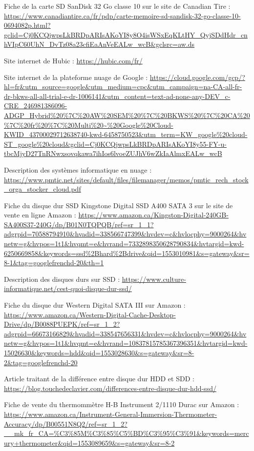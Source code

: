 \begin{thebibliographyUL}{9}
 Fiche de la carte SD SanDisk 32 Go classe 10 sur le site de Canadian Tire :
\url{https://www.canadiantire.ca/fr/pdp/carte-memoire-sd-sandisk-32-go-classe-10-0694082p.html?gclid=Cj0KCQjwpsLkBRDpARIsAKoYI8y8O4isWSxEqKLtHY_QyjSDdHdr_cnhVIpC60UhN_DvTz08a23cfiEaAnVeEALw_wcB&gclsrc=aw.ds}

 Site internet de Hubic :
\url{https://hubic.com/fr/}

 Site internet de la plateforme nuage de Google :
\url{https://cloud.google.com/gcp/?hl=fr&utm_source=google&utm_medium=cpc&utm_campaign=na-CA-all-fr-dr-bkws-all-all-trial-e-dr-1006141&utm_content=text-ad-none-any-DEV_c-CRE_246981386096-ADGP_Hybrid\%20\%7C\%20AW\%20SEM\%20\%7C\%20BKWS\%20\%7C\%20CA\%20\%7C\%20fr\%20\%7C\%20Multi\%20~\%20Google\%20Cloud-KWID_43700029712638740-kwd-6458750523&utm_term=KW_google\%20cloud-ST_google\%20cloud&gclid=Cj0KCQjwpsLkBRDpARIsAKoYI8y55-FY-u-tbcMjyD27TnRNwxsovqkawa7ihIos6lvoeZUJhV6wZkIaAlmxEALw_wcB}

 Description des systèmes informatique en nuage :
\url{https://www.pmtic.net/sites/default/files/filemanager/memos/pmtic_rech_stock_orga_stocker_cloud.pdf}

Fiche du disque dur SSD Kingstone Digital SSD A400 SATA 3 sur le site de vente en ligne Amazon :
\url{https://www.amazon.ca/Kingston-Digital-240GB-SA400S37-240G/dp/B01N0TQPQB/ref=sr_1_1?adgrpid=70588794910&hvadid=338566747399&hvdev=c&hvlocphy=9000264&hvnetw=g&hvpos=1t1&hvqmt=e&hvrand=7332898350628790834&hvtargid=kwd-6250669858&keywords=ssd\%2Bhard\%2Bdrive&qid=1553010981&s=gateway&sr=8-1&tag=googlefrenchd-20&th=1}

 Description des disques durs sur SSD :
\url{https://www.culture-informatique.net/cest-quoi-disque-dur-ssd/}

 Fiche du disque dur Western Digital SATA III sur Amazon :
\url{https://www.amazon.ca/Western-Digital-Cache-Desktop-Drive/dp/B0088PUEPK/ref=sr_1_2?adgrpid=66673166829&hvadid=338547656331&hvdev=c&hvlocphy=9000264&hvnetw=g&hvpos=1t1&hvqmt=e&hvrand=10837815785367396351&hvtargid=kwd-15026630&keywords=hdd&qid=1553028630&s=gateway&sr=8-2&tag=googlefrenchd-20}

 Article traitant de la différence entre disque dur HDD et SDD :
\url{https://blog.touchedeclavier.com/differences-entre-disque-dur-hdd-ssd/}

 Fiche de vente du thermommètre H-B Instrument 2/1110 Durac sur Amazon :
\url{https://www.amazon.ca/Instrument-General-Immersion-Thermometer-Accuracy/dp/B00551N8Q2/ref=sr_1_2?__mk_fr_CA=\%C3\%85M\%C3\%85\%C5\%BD\%C3\%95\%C3\%91&keywords=mercury+thermometer&qid=1553089659&s=gateway&sr=8-2}


\end{thebibliographyUL}

